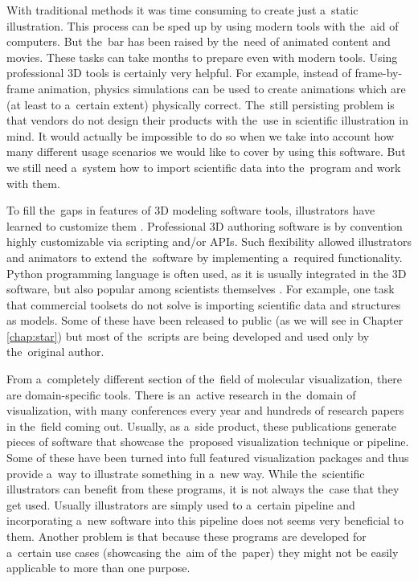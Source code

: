 \documentclass[
  digital, %
  table,   %
  nolof,     %
  nolot,     %
  oneside,
]{fithesis3}
\begin{document}
With traditional methods it was time consuming to create just a static illustration. This process can be sped up by using modern tools with the aid of computers. But the bar has been raised by the need of animated content and movies. These tasks can take months to prepare even with modern tools. Using professional 3D tools is certainly very helpful. For example, instead of frame-by-frame animation, physics simulations can be used to create animations which are (at least to a certain extent) physically correct. The still persisting problem is that vendors do not design their products with the use in scientific illustration in mind. It would actually be impossible to do so when we take into account how many different usage scenarios we would like to cover by using this software. But we still need a system how to import scientific data into the program and work with them.

To fill the gaps in features of 3D modeling software tools, illustrators have learned to customize them \cite{GrahamGaelInterview}. Professional 3D authoring software is by convention highly customizable via scripting and/or APIs. Such flexibility allowed illustrators and animators to extend the software by implementing a required functionality. Python programming language is often used, as it is usually integrated in the 3D software, but also popular among scientists themselves \cite{scientificPython}. For example, one task that commercial toolsets do not solve is importing scientific data and structures as models. Some of these have been released to public (as we will see in Chapter \ref{chap:star}) but most of the scripts are being developed and used only by the original author.

From a completely different section of the field of molecular visualization, there are domain-specific tools. There is an active research in the domain of visualization, with many conferences every year and hundreds of research papers in the field coming out. Usually, as a side product, these publications generate pieces of software that showcase the proposed visualization technique or pipeline. Some of these have been turned into full featured visualization packages and thus provide a way to illustrate something in a new way. While the scientific illustrators can benefit from these programs, it is not always the case that they get used. Usually illustrators are simply used to a certain pipeline and incorporating a new software into this pipeline does not seems very beneficial to them. Another problem is that because these programs are developed for a certain use cases (showcasing the aim of the paper) they might not be easily applicable to more than one purpose.
\end{document}
